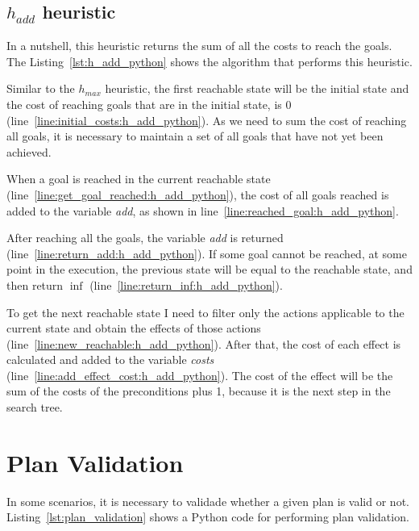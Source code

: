 \documentclass[letterpaper]{article}
\begin{document}
\subsection{$h_{add}$ heuristic}

In a nutshell, this heuristic returns the sum of all the costs to reach the goals. The Listing~\ref{lst:h_add_python} shows the algorithm that performs this heuristic.



Similar to the $h_{max}$ heuristic, the first reachable state will be the initial state and the cost of reaching goals that are in the initial state, is $0$ (line~\ref{line:initial_costs:h_add_python}). As we need to sum the cost of reaching all goals, it is necessary to maintain a set of all goals that have not yet been achieved.

When a goal is reached in the current reachable state (line~\ref{line:get_goal_reached:h_add_python}), the cost of all goals reached is added to the variable \textit{add}, as shown in line~\ref{line:reached_goal:h_add_python}.

After reaching all the goals, the variable \textit{add} is returned (line~\ref{line:return_add:h_add_python}). If some goal cannot be reached, at some point in the execution, the previous state will be equal to the reachable state, and then return $\inf$ (line~\ref{line:return_inf:h_add_python}).

To get the next reachable state I need to filter only the actions applicable to the current state and obtain the effects of those actions (line~\ref{line:new_reachable:h_add_python}). After that, the cost of each effect is calculated and added to the variable \textit{costs} (line~\ref{line:add_effect_cost:h_add_python}). The cost of the effect will be the sum of the costs of the preconditions plus 1, because it is the next step in the search tree.


\section{Plan Validation}

In some scenarios, it is necessary to validade whether a given plan is valid or not. Listing~\ref{lst:plan_validation} shows a Python code for performing plan validation.


\end{document}
